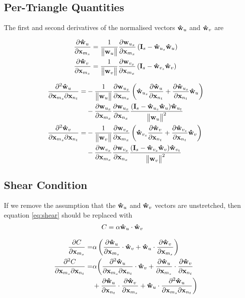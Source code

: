 \documentclass[twocolumn]{article}
\newcommand{\norm}[1]{\begin{Vmatrix}#1\end{Vmatrix}}
\newcommand{\pfrac}[2]{
    \frac{\partial #1}{\partial #2}
}
\newcommand{\pfractwo}[3]{
    \frac{\partial^2 #1}{\partial #2 \partial #3}
}
\newcommand{\Is}{{\bf I}_s}
\newcommand{\x}{{\bf x}}
\newcommand{\xms}{\x_{m_s}}
\newcommand{\xmx}{\x_{m_x}}
\newcommand{\xnt}{\x_{n_t}}
\newcommand{\xnx}{\x_{n_x}}
\newcommand{\w}{{\bf w}}
\newcommand{\what}{{\bf {\hat w}}}
\newcommand{\wu}{\w_u}
\newcommand{\wux}{\w_{u_x}}
\newcommand{\whatu}{\what_u}
\newcommand{\whatus}{\what_{u_s}}
\newcommand{\whatut}{\what_{u_t}}
\newcommand{\wv}{\w_v}
\newcommand{\wvx}{\w_{v_x}}
\newcommand{\whatv}{\what_v}
\newcommand{\whatvs}{\what_{v_s}}
\newcommand{\whatvt}{\what_{v_t}}
\begin{document}
\subsection{Per-Triangle Quantities}
The first and second derivatives of the normalised vectors $\whatu$ and
$\whatv$ are

\begin{align}
\pfrac{\whatu}{\xms} &=
   \frac{1}{\norm{\wu}}
   \pfrac{\wux}{\xmx} \left( \Is - \whatus \whatu \right) \\
%
\pfrac{\whatv}{\xms} &=
   \frac{1}{\norm{\wv}}
   \pfrac{\wvx}{\xmx} \left( \Is - \whatvs \whatv \right)
\end{align}

\begin{align}
\pfractwo{\whatu}{\xms}{\xnt} =&
   -\frac{1}{\norm{\wu}} \pfrac{\wux}{\xmx} \left(
       \whatus \pfrac{\whatu}{\xnt} + \pfrac{\whatus}{\xnt} \whatu
   \right) \notag \\&-
   \pfrac{\wux}{\xmx} \pfrac{\wux}{\xnx}
   \frac{( \Is - \whatus \whatu ) \whatut}{\norm{\wu}^2} \\
%
\pfractwo{\whatv}{\xms}{\xnt} =&
   -\frac{1}{\norm{\wv}} \pfrac{\wvx}{\xmx} \left(
       \whatvs \pfrac{\whatv}{\xnt} + \pfrac{\whatvs}{\xnt} \whatv
   \right) \notag \\&-
   \pfrac{\wvx}{\xmx} \pfrac{\wvx}{\xnx}
   \frac{( \Is - \whatvs \whatv ) \whatvt}{\norm{\wv}^2}
\end{align}

\subsection{Shear Condition}

If we remove the assumption that the $\whatu$ and $\whatv$ vectors are
unstretched, then equation \eqref{eq:shear} should be replaced with
\begin{align}
C &= \alpha \whatu \cdot \whatv
\end{align}

\begin{align}
%
\pfrac{C}{\xms} =& \alpha \left(
   \pfrac{\whatu}{\xms} \cdot \whatv + \whatu \cdot \pfrac{\whatv}{\xms}
\right) \\
%
\pfractwo{C}{\xms}{\xnt} =& \alpha \bigg(
   \pfractwo{\whatu}{\xms}{\xnt} \cdot \whatv +
   \pfrac{\whatu}{\xms} \cdot \pfrac{\whatv}{\xnt} \notag \\&+
   \pfrac{\whatu}{\xnt} \cdot \pfrac{\whatv}{\xms} +
   \whatu \cdot \pfractwo{\whatu}{\xms}{\xnt} \biggr)
\end{align}
\end{document}
